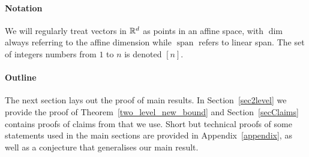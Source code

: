 \paragraph{Notation}
We will regularly treat vectors in ${\mathbb{R}}^d$ as points in an affine space, with $\operatorname{dim}$ always referring to the affine dimension while $\operatorname{span}$ refers to linear span. The set of integers numbers from $1$ to $n$ is denoted $[n]$. 

\paragraph{Outline}
The next section lays out the proof of main results. In Section~\ref{sec2level} we provide the proof of Theorem~\ref{two_level_new_bound} and Section~\ref{secClaims} contains proofs of claims from \cite{kupavskii22} that we use. Short but technical proofs of some statements used in the main sections are provided in Appendix~\ref{appendix}, as well as a conjecture that generalises our main result.